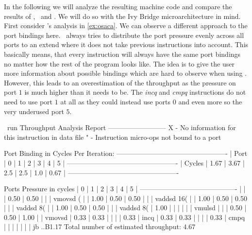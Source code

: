 In the following we will analyze the resulting machine code and compare the results of \iaca, \osaca\ and \suaca. We will do so with the Ivy Bridge microarchitecture in mind. First consider \osaca's analysis in \autoref{ex:osaca}. We can observe a different approach to the port bindings here. \osaca\ always tries to distribute the port pressure evenly across all ports to an extend where it does not take previous instructions into account. This basically means, that every instruction will always have the same port bindings no matter how the rest of the program looks like. The idea is to give the user more information about possible bindings which are hard to observe when using \iaca. However, this leads to an overestimation of the throughput as the pressure on port $1$ is much higher than it needs to be. The \emph{incq} and \emph{cmpq} instructions do not need to use port $1$ at all as they could instead use ports $0$ and even more so the very underused port $5$. 


\begin{LabeledExample}{\osaca\ run}{\label{ex:osaca}}
    Throughput Analysis Report
    --------------------------
    X - No information for this instruction in data file
    " - Instruction micro-ops not bound to a port
    
    Port Binding in Cycles Per Iteration:
    -------------------------------------------------
    | Port   |   0  |   1  |  2  |  3  |  4  |   5  |
    -------------------------------------------------
    | Cycles | 1.67 | 3.67 | 2.5 | 2.5 | 1.0 | 0.67 |
    -------------------------------------------------
    
    Ports Pressure in cycles
    |   0  |   1  |   2  |   3  |   4  |   5  |
    -------------------------------------------
    |      |      | 0.50 | 0.50 |      |      | vmovsd  (%
    |      | 1.00 | 0.50 | 0.50 |      |      | vaddsd  16(%
    |      | 1.00 | 0.50 | 0.50 |      |      | vaddsd  8(%
    |      | 1.00 | 0.50 | 0.50 |      |      | vaddsd  8(%
    | 1.00 |      |      |      |      |      | vmulsd  %
    |      |      | 0.50 | 0.50 | 1.00 |      | vmovsd  %
    | 0.33 | 0.33 |      |      |      | 0.33 | incq    %
    | 0.33 | 0.33 |      |      |      | 0.33 | cmpq    %
    |      |      |      |      |      |      | jb      ..B1.17
    Total number of estimated throughput: 4.67
\end{LabeledExample}

